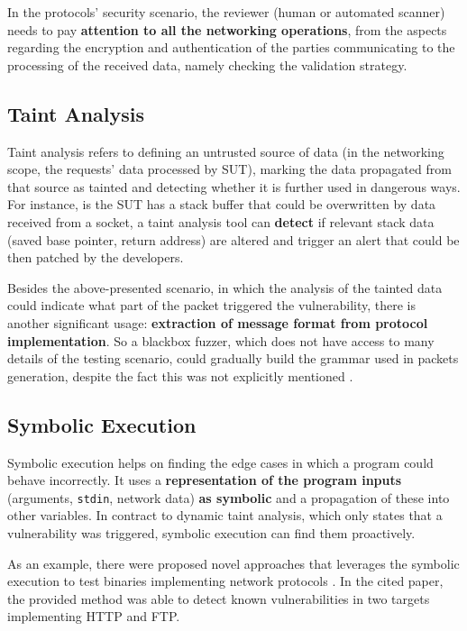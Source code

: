 \documentclass[10pt,a4paper,english,onecolumn]{IEEEtran}
\begin{document}
In the protocols' security scenario, the reviewer (human or automated scanner) needs to pay \textbf{attention to all the networking operations}, from the aspects regarding the encryption and authentication of the parties communicating to the processing of the received data, namely checking the validation strategy.

\subsection{Taint Analysis}

Taint analysis refers to defining an untrusted source of data (in the networking scope, the requests' data processed by SUT), marking the data propagated from that source as tainted and detecting whether it is further used in dangerous ways. For instance, is the SUT has a stack buffer that could be overwritten by data received from a socket, a taint analysis tool can \textbf{detect} if relevant stack data (saved base pointer, return address) are altered and trigger an alert that could be then patched by the developers.

Besides the above-presented scenario, in which the analysis of the tainted data could indicate what part of the packet triggered the vulnerability, there is another significant usage: \textbf{extraction of message format from protocol implementation}. So a blackbox fuzzer, which does not have access to many details of the testing scenario, could gradually build the grammar used in packets generation, despite the fact this was not explicitly mentioned \cite{polyglot}.

\subsection{Symbolic Execution}

Symbolic execution helps on finding the edge cases in which a program could behave incorrectly. It uses a \textbf{representation of the program inputs} (arguments, \texttt{stdin}, network data) \textbf{as symbolic} and a propagation of these into other variables. In contract to dynamic taint analysis, which only states that a vulnerability was triggered, symbolic execution can find them proactively.

As an example, there were proposed novel approaches that leverages the symbolic execution to test binaries implementing network protocols \cite{symex_protocols}. In the cited paper, the provided method was able to detect known vulnerabilities in two targets implementing HTTP and FTP.
\end{document}
